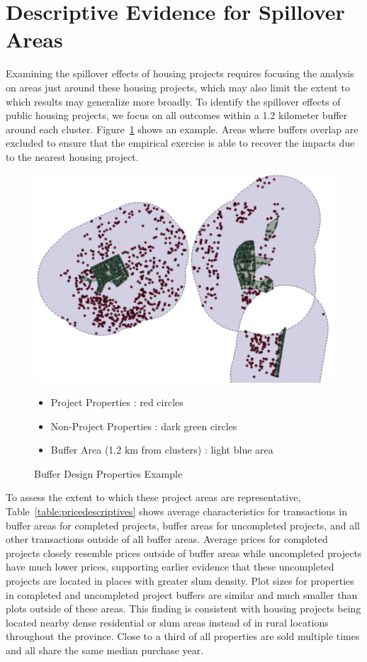 \documentclass[12pt]{article}
\begin{document}
\section{Descriptive Evidence for Spillover Areas}\label{section:descriptives}

Examining the spillover effects of housing projects requires focusing the analysis on areas just around these housing projects, which may also limit the extent to which results may generalize more broadly.  To identify the spillover effects of public housing projects, we focus on all outcomes within a 1.2 kilometer buffer around each cluster.  Figure~\ref{figure:bufferdesign} shows an example.  Areas where buffers overlap are excluded to ensure that the empirical exercise is able to recover the impacts due to the nearest housing project.  

\begin{figure}
\caption{Buffer Design Properties Example}\label{figure:bufferdesign}
\centering
\includegraphics[scale=.4]{figures/design.png} 
\begin{itemize}
\item Project Properties : red circles
\item Non-Project Properties : dark green circles
\item Buffer Area (1.2 km from clusters) : light blue area
\end{itemize}
\end{figure}

To assess the extent to which these project areas are representative, Table~\ref{table:pricedescriptives} shows average characteristics for transactions in buffer areas for completed projects, buffer areas for uncompleted projects, and all other transactions outside of all buffer areas.  Average prices for completed projects closely resemble prices outside of buffer areas while uncompleted projects have much lower prices, supporting earlier evidence that these uncompleted projects are located in places with greater slum density.  Plot sizes for properties in completed and uncompleted project buffers are similar and much smaller than plots outside of these areas.  This finding is consistent with housing projects being located nearby dense residential or slum areas instead of in rural locations throughout the province.  Close to a third of all properties are sold multiple times and all share the same median purchase year.
\end{document}
